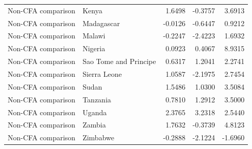 \begin{table}
\begin{tabular}[t]{llrrr}
Non-CFA comparison & Kenya & 1.6498 & -0.3757 & 3.6913\\
\addlinespace
Non-CFA comparison & Madagascar & -0.0126 & -0.6447 & 0.9212\\
Non-CFA comparison & Malawi & -0.2247 & -2.4223 & 1.6932\\
Non-CFA comparison & Nigeria & 0.0923 & 0.4067 & 8.9315\\
Non-CFA comparison & Sao Tome and Principe & 0.6317 & 1.2041 & 2.2741\\
Non-CFA comparison & Sierra Leone & 1.0587 & -2.1975 & 2.7454\\
\addlinespace
Non-CFA comparison & Sudan & 1.5486 & 1.0300 & 3.5084\\
Non-CFA comparison & Tanzania & 0.7810 & 1.2912 & 3.5000\\
Non-CFA comparison & Uganda & 2.3765 & 3.2318 & 2.5440\\
Non-CFA comparison & Zambia & 1.7632 & -0.3739 & 4.8123\\
Non-CFA comparison & Zimbabwe & -0.2888 & -2.1224 & -1.6960\\
\bottomrule
\end{tabular}
\end{table}